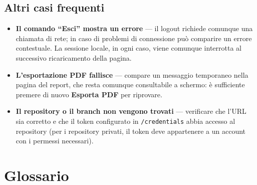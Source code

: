 \documentclass[11pt,a4paper]{article}
\newcommand{\route}[1]{\texttt{#1}}
\begin{document}
\subsection{Altri casi frequenti}

\begin{itemize}
  \item \textbf{Il comando ``Esci'' mostra un errore} --- il logout richiede comunque una
        chiamata di rete; in caso di problemi di connessione può comparire un errore
        contestuale. La sessione locale, in ogni caso, viene comunque interrotta al
        successivo ricaricamento della pagina.
  \item \textbf{L'esportazione PDF fallisce} --- compare un messaggio temporaneo nella
        pagina del report, che resta comunque consultabile a schermo: è sufficiente
        premere di nuovo \textbf{Esporta PDF} per riprovare.
  \item \textbf{Il repository o il branch non vengono trovati} --- verificare che l'URL sia
        corretto e che il token configurato in \route{/credentials} abbia accesso al
        repository (per i repository privati, il token deve appartenere a un account con
        i permessi necessari).
\end{itemize}

\newpage
\section{Glossario}
\end{document}
